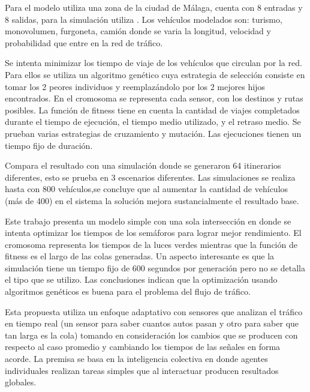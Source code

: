\begin{itemize}
\begin{item}
		Para el modelo utiliza una zona  de la ciudad de Málaga, cuenta con 8 entradas y 8 salidas, para la simulación utiliza \citep{SUMO}. Los vehículos modelados son: turismo, monovolumen, furgoneta, camión donde se varia la longitud, velocidad y probabilidad que entre en la red de tráfico.
		
		Se intenta minimizar los tiempo de viaje de los vehículos que circulan por la red. Para ellos se utiliza un algoritmo genético cuya estrategia de selección consiste en tomar los 2 peores individuos y reemplazándolo por los 2 mejores hijos encontrados. En el cromosoma se representa cada sensor, con los destinos y rutas posibles. La función de fitness tiene en cuenta la cantidad de viajes completados durante el tiempo de ejecución, el tiempo medio utilizado, y el retraso medio. Se prueban varias estrategias de cruzamiento y mutación. Las ejecuciones tienen un tiempo fijo de duración.
		
		
		Compara el resultado con una simulación donde se generaron 64 itinerarios diferentes, esto se prueba en 3 escenarios diferentes. Las simulaciones se realiza hasta con 800 vehículos,se concluye que al aumentar la cantidad de vehículos (más de 400) en el sistema la solución mejora sustancialmente el resultado base.
		
	\end{item}	
	
	
	\begin{item}
		Este trabajo presenta un modelo simple con una sola intersección en donde se intenta optimizar los tiempos de los semáforos para lograr mejor rendimiento. El cromosoma representa los tiempos de la luces verdes mientras que la función de fitness es el largo de las colas generadas. Un aspecto interesante es que la simulación tiene un tiempo fijo de 600 segundos por generación pero no se detalla el tipo que se utilizo. Las conclusiones indican que la optimización usando algoritmos genéticos  es buena para el problema del flujo de tráfico.	
	\end{item}	
	
	
	\begin{item}
		\bibentry{Montana1996}
		Esta propuesta utiliza un enfoque adaptativo con sensores que analizan el tráfico en tiempo real (un sensor para saber cuantos autos pasan y otro para saber que tan larga es la cola) tomando en consideración los cambios que se producen con respecto al caso promedio y cambiando los tiempos de las señales en forma acorde.
		La premisa se basa en la inteligencia colectiva en donde agentes individuales realizan tareas simples que al interactuar producen resultados globales.
		

\end{item}
\end{itemize}
